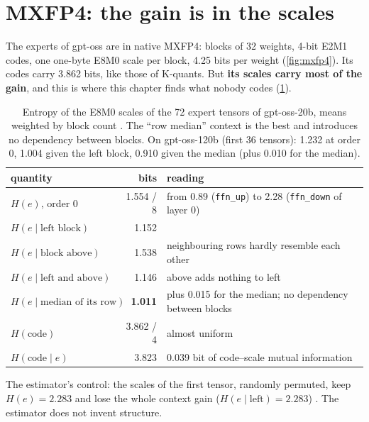 \section{MXFP4: the gain is in the scales}\label{sec:ent-mxfp4}

The experts of gpt-oss are in native MXFP4: blocks of 32 weights, 4-bit E2M1 codes, one one-byte E8M0 scale per block, 4.25 bits per weight (\cref{fig:mxfp4}). Its codes carry 3.862 bits, like those of K-quants. But \textbf{its scales carry most of the gain}, and this is where this chapter finds what nobody codes (\cref{tab:ent-echelles}).

\begin{table}[ht]
\centering\small
\caption[Entropy of the E8M0 scales by context]{Entropy of the E8M0 scales of the 72 expert tensors of gpt-oss-20b, means weighted by block count \mes. The ``row median'' context is the best and introduces no dependency between blocks. On gpt-oss-120b (first 36 tensors): 1.232 at order 0, 1.004 given the left block, 0.910 given the median (plus 0.010 for the median).}
\label{tab:ent-echelles}
\begin{tabular}{@{}lrl@{}}
\toprule
quantity & bits & reading \\
\midrule
$H(e)$, order 0 & 1.554 / 8 & from 0.89 (\texttt{ffn\_up}) to 2.28 (\texttt{ffn\_down} of layer 0) \\
$H(e \mid \text{left block})$ & 1.152 & \\
$H(e \mid \text{block above})$ & 1.538 & neighbouring rows hardly resemble each other \\
$H(e \mid \text{left and above})$ & 1.146 & above adds nothing to left \\
$H(e \mid \text{median of its row})$ & \textbf{1.011} & plus 0.015 for the median; no dependency between blocks \\
$H(\text{code})$ & 3.862 / 4 & almost uniform \\
$H(\text{code} \mid e)$ & 3.823 & 0.039 bit of code--scale mutual information \\
\bottomrule
\end{tabular}
\end{table}

The estimator's control: the scales of the first tensor, randomly permuted, keep $H(e) = 2.283$ and lose the whole context gain ($H(e \mid \text{left}) = 2.283$) \mes. The estimator does not invent structure.

